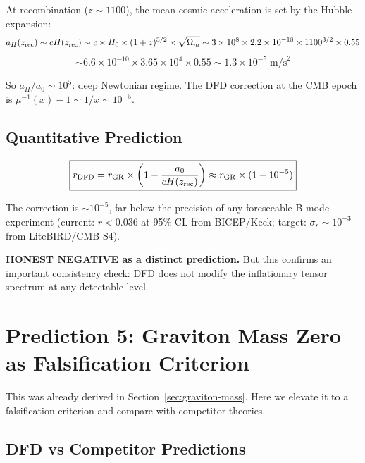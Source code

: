 \documentclass[11pt]{article}
\begin{document}
At recombination ($z \sim 1100$), the mean cosmic acceleration is
set by the Hubble expansion:
\begin{equation}
a_H(z_{\rm rec}) \sim c H(z_{\rm rec}) \sim c \times H_0 \times (1+z)^{3/2}
\times \sqrt{\Omega_m}
\sim 3 \times 10^8 \times 2.2 \times 10^{-18} \times 1100^{3/2} \times 0.55
\end{equation}
\begin{equation}
\sim 6.6 \times 10^{-10} \times 3.65 \times 10^4 \times 0.55
\sim 1.3 \times 10^{-5}\;\text{m/s}^2
\end{equation}

So $a_H/a_0 \sim 10^5$: deep Newtonian regime.  The DFD correction
at the CMB epoch is $\mu^{-1}(x) - 1 \sim 1/x \sim 10^{-5}$.

\subsection{Quantitative Prediction}

\begin{equation}
\boxed{
r_{\rm DFD} = r_{\rm GR} \times \left(1 - \frac{a_0}{cH(z_{\rm rec})}\right)
\approx r_{\rm GR} \times (1 - 10^{-5})
}
\end{equation}

The correction is $\sim 10^{-5}$, far below the precision of any
foreseeable B-mode experiment (current: $r < 0.036$ at 95\% CL from
BICEP/Keck; target: $\sigma_r \sim 10^{-3}$ from LiteBIRD/CMB-S4).

\textbf{HONEST NEGATIVE as a distinct prediction.}  But this confirms
an important consistency check: DFD does not modify the inflationary
tensor spectrum at any detectable level.

\section{Prediction 5: Graviton Mass Zero as Falsification Criterion}
\label{sec:graviton-falsification}

This was already derived in Section~\ref{sec:graviton-mass}.  Here we
elevate it to a falsification criterion and compare with competitor
theories.

\subsection{DFD vs Competitor Predictions}
\end{document}
